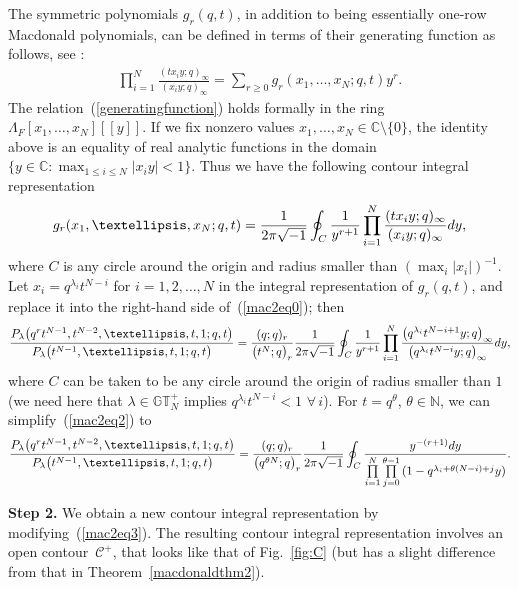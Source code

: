 \documentclass[11pt]{article}
\numberwithin{equation}{section}
\newcommand{\C}{\mathbb{C}}
\newcommand{\N}{\mathbb{N}}
\newcommand{\CC}{\mathcal{C}}
\newcommand{\GTp}{\mathbb{GT}^+}
\begin{document}
The symmetric polynomials $g_r(q, t)$, in addition to being essentially one-row Macdonald polynomials, can be def\/ined in terms of their generating function as follows, see \cite[Chapter~VI]{M2}:
\begin{gather}\label{generatingfunction}
\prod_{i=1}^N{\frac{(tx_iy; q)_{\infty}}{(x_iy; q)_{\infty}}} = \sum_{r\geq 0}g_r(x_1, \dots, x_N; q, t)y^r.
\end{gather}
The relation~(\ref{generatingfunction}) holds formally in the ring $\Lambda_F[x_1, \dots, x_N][[y]]$. If we f\/ix nonzero values $x_1, \dots, x_N\in\C\setminus\{0\}$, the identity above is an equality of real analytic functions in the domain $\{y\in\C \colon \max_{1\leq i\leq N}{|x_i y|} < 1\}$. Thus we have the following contour integral representation
\begin{gather*}
g_r(x_1, \dots, x_N; q, t) = \frac{1}{2\pi\sqrt{-1}}\oint_C{\frac{1}{y^{r+1}}\prod_{i=1}^N{\frac{(tx_iy; q)_{\infty}}{(x_iy; q)_{\infty}}{\rm d}y}},
\end{gather*}
where $C$ is any circle around the origin and radius smaller than $(\max_i{|x_i|})^{-1}$. Let $x_i = q^{\lambda_i}t^{N-i}$ for $i = 1, 2, \dots, N$ in the integral representation of $g_r(q, t)$, and replace it into the right-hand side of~(\ref{mac2eq0}); then
\begin{gather}\label{mac2eq2}
\frac{P_{\lambda}\big(q^rt^{N-1}, t^{N-2}, \dots, t, 1; q, t\big)}{P_{\lambda}\big(t^{N-1}, \dots, t, 1; q, t\big)} = \frac{(q; q)_r}{\big(t^N; q\big)_r}\frac{1}{2\pi\sqrt{-1}}\oint_C{\frac{1}{y^{r+1}}\prod_{i=1}^N{\frac{\big(q^{\lambda_i}t^{N-i+1}y; q\big)_{\infty}}{\big(q^{\lambda_i}t^{N-i}y; q\big)_{\infty}}{\rm d}y}},
\end{gather}
where $C$ can be taken to be any circle around the origin of radius smaller than $1$ (we need here that $\lambda\in\GTp_N$ implies $q^{\lambda_i}t^{N-i} < 1$ $\forall\, i$). For $t = q^{\theta}$, $\theta\in\N$, we can simplify~(\ref{mac2eq2}) to
\begin{gather}\label{mac2eq3}
\frac{P_{\lambda}\big(q^rt^{N-1}, t^{N-2}, \dots, t, 1; q, t\big)}{P_{\lambda}\big(t^{N-1}, \dots, t, 1; q, t\big)} = \frac{(q; q)_r}{\big(q^{\theta N}; q\big)_r}\frac{1}{2\pi\sqrt{-1}}\oint_C
{\frac{y^{-(r+1)} {\rm d}y}{\prod\limits_{i=1}^N{\prod\limits_{j=0}^{\theta-1}{(1 - q^{\lambda_i + \theta(N - i) + j}y)}}}}.
\end{gather}

\textbf{Step 2.} We obtain a new contour integral representation by modifying~(\ref{mac2eq3}). The resulting contour integral representation involves an open contour~$\CC^+$, that looks like that of Fig.~\ref{fig:C} (but has a slight dif\/ference from that in Theorem~\ref{macdonaldthm2}).
\end{document}
